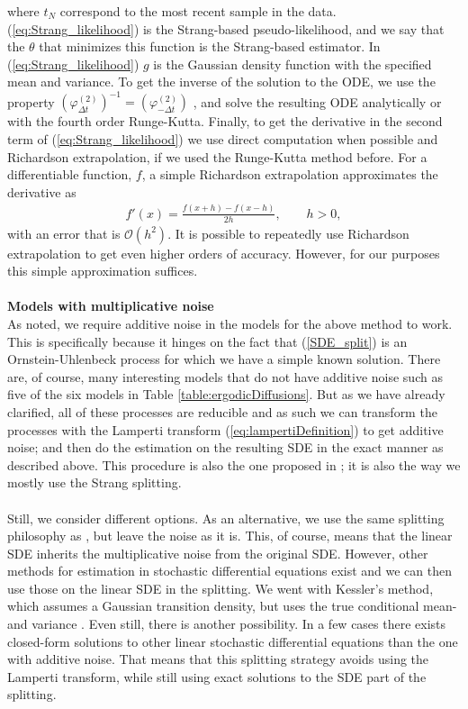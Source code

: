 where $t_N$ correspond to the most recent sample in the data. (\ref{eq:Strang_likelihood}) is the Strang-based pseudo-likelihood, and we say that the $\theta$ that minimizes this function is the Strang-based estimator. In (\ref{eq:Strang_likelihood}) $g$ is the Gaussian density function with the specified mean and variance. 
To get the inverse of the solution to the ODE, we use the property $\left(\varphi_{\Delta t}^{(2)}\right)^{-1} = \left(\varphi_{-\Delta t}^{(2)}\right)$ \cite[Remark below equation (9)]{SplittingSchemes}, and solve the resulting ODE analytically or with the fourth order Runge-Kutta. Finally, to get the derivative in the second term of (\ref{eq:Strang_likelihood}) we use direct computation when possible and Richardson extrapolation, if we used the Runge-Kutta method before. For a differentiable function, $f$, a simple Richardson extrapolation approximates the derivative as
\begin{align}
    f'(x) = \frac{f(x + h) - f(x - h)}{2h}, \qquad h > 0,
\end{align}
with an error that is $\mathcal{O}(h^2)$. It is possible to repeatedly use Richardson extrapolation to get even higher orders of accuracy. However, for our purposes this simple approximation suffices.
\\\\
\textbf{Models with multiplicative noise}\\
As noted, we require additive noise in the models for the above method to work. This is specifically because it hinges on the fact that (\ref{SDE_split}) is an Ornstein-Uhlenbeck process for which we have a simple known solution. There are, of course, many interesting models that do not have additive noise such as five of the six models in Table \ref{table:ergodicDiffusions}. But as we have already clarified, all of these processes are reducible and as such we can transform the processes with the Lamperti transform (\ref{eq:lampertiDefinition}) to get additive noise; and then do the estimation on the resulting SDE in the exact manner as described above. This procedure is also the one proposed in \cite{SplittingSchemes}; it is also the way we mostly use the Strang splitting.\\\\
Still, we consider different options. As an alternative, we use the same splitting philosophy as \cite{SplittingSchemes}, but leave the noise as it is. This, of course, means that the linear SDE inherits the multiplicative noise from the original SDE. However, other methods for estimation in stochastic differential equations exist and we can then use those on the linear SDE in the splitting. We went with Kessler's method, which assumes a Gaussian transition density, but uses the true conditional mean- and variance \cite[equation (1.7)]{Kessler1997}. Even still, there is another possibility. In a few cases there exists closed-form solutions to other linear stochastic differential equations than the one with additive noise. That means that this splitting strategy avoids using the Lamperti transform, while still using exact solutions to the SDE part of the splitting. \\\\

